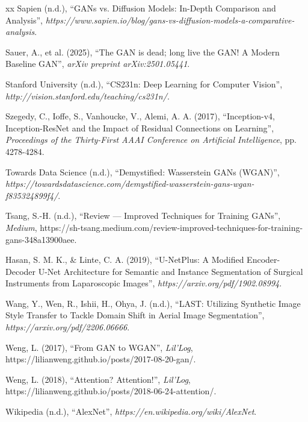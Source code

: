 \begin{thebibliography}{xx}
Sapien (n.d.), ``GANs vs. Diffusion Models: In-Depth Comparison and Analysis'', {\em https://www.sapien.io/blog/gans-vs-diffusion-models-a-comparative-analysis}.

Sauer, A., et al. (2025), ``The GAN is dead; long live the GAN! A Modern Baseline GAN'', {\em arXiv preprint arXiv:2501.05441}.

Stanford University (n.d.), ``CS231n: Deep Learning for Computer Vision'', {\em http://vision.stanford.edu/teaching/cs231n/}.

Szegedy, C., Ioffe, S., Vanhoucke, V., Alemi, A. A. (2017), ``Inception-v4, Inception-ResNet and the Impact of Residual Connections on Learning'', {\em Proceedings of the Thirty-First AAAI Conference on Artificial Intelligence}, pp. 4278-4284.

Towards Data Science (n.d.), ``Demystified: Wasserstein GANs (WGAN)'', {\em https://towardsdatascience.com/demystified-wasserstein-gans-wgan-f835324899f4/}.

Tsang, S.-H. (n.d.), ``Review — Improved Techniques for Training GANs'', {\em Medium}, https://sh-tsang.medium.com/review-improved-techniques-for-training-gans-348a13900aee.

Hasan, S. M. K., \& Linte, C. A. (2019), ``U-NetPlus: A Modified Encoder-Decoder U-Net Architecture for Semantic and Instance Segmentation of Surgical Instruments from Laparoscopic Images'', {\em https://arxiv.org/pdf/1902.08994}.

Wang, Y., Wen, R., Ishii, H., Ohya, J. (n.d.), ``LAST: Utilizing Synthetic Image Style Transfer to Tackle Domain Shift in Aerial Image Segmentation'', {\em https://arxiv.org/pdf/2206.06666}.

Weng, L. (2017), ``From GAN to WGAN'', {\em Lil'Log}, https://lilianweng.github.io/posts/2017-08-20-gan/.

Weng, L. (2018), ``Attention? Attention!'', {\em Lil'Log}, https://lilianweng.github.io/posts/2018-06-24-attention/.

Wikipedia (n.d.), ``AlexNet'', {\em https://en.wikipedia.org/wiki/AlexNet}.


\end{thebibliography}
